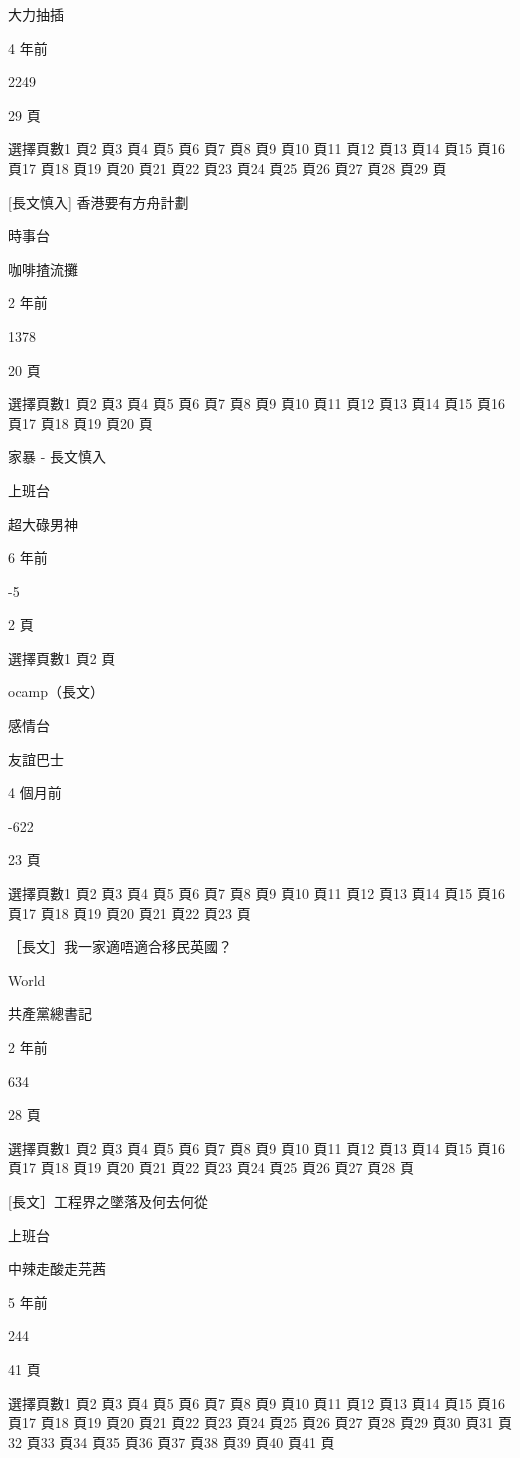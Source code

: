 大力抽插

4 年前

2249

29 頁

選擇頁數1 頁2 頁3 頁4 頁5 頁6 頁7 頁8 頁9 頁10 頁11 頁12 頁13 頁14 頁15 頁16 頁17 頁18 頁19 頁20 頁21 頁22 頁23 頁24 頁25 頁26 頁27 頁28 頁29 頁

[長文慎入] 香港要有方舟計劃

時事台

咖啡揸流攤

2 年前

1378

20 頁

選擇頁數1 頁2 頁3 頁4 頁5 頁6 頁7 頁8 頁9 頁10 頁11 頁12 頁13 頁14 頁15 頁16 頁17 頁18 頁19 頁20 頁

家暴 - 長文慎入

上班台

超大碌男神

6 年前

-5

2 頁

選擇頁數1 頁2 頁

ocamp（長文）

感情台

友誼巴士

4 個月前

-622

23 頁

選擇頁數1 頁2 頁3 頁4 頁5 頁6 頁7 頁8 頁9 頁10 頁11 頁12 頁13 頁14 頁15 頁16 頁17 頁18 頁19 頁20 頁21 頁22 頁23 頁

［長文］我一家適唔適合移民英國？

World

共產黨總書記

2 年前

634

28 頁

選擇頁數1 頁2 頁3 頁4 頁5 頁6 頁7 頁8 頁9 頁10 頁11 頁12 頁13 頁14 頁15 頁16 頁17 頁18 頁19 頁20 頁21 頁22 頁23 頁24 頁25 頁26 頁27 頁28 頁

[長文］工程界之墜落及何去何從

上班台

中辣走酸走芫茜

5 年前

244

41 頁

選擇頁數1 頁2 頁3 頁4 頁5 頁6 頁7 頁8 頁9 頁10 頁11 頁12 頁13 頁14 頁15 頁16 頁17 頁18 頁19 頁20 頁21 頁22 頁23 頁24 頁25 頁26 頁27 頁28 頁29 頁30 頁31 頁32 頁33 頁34 頁35 頁36 頁37 頁38 頁39 頁40 頁41 頁

